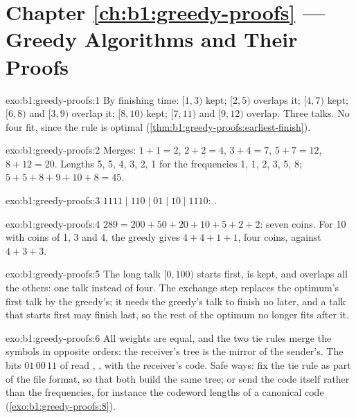 \section*{Chapter \ref{ch:b1:greedy-proofs} --- Greedy Algorithms and Their Proofs}

\begin{solution}{exo:b1:greedy-proofs:1}
By finishing time: $[1, 3)$ kept; $[2, 5)$ overlaps it; $[4, 7)$ kept; $[6, 8)$ and $[3, 9)$ overlap it; $[8, 10)$ kept;
$[7, 11)$ and $[9, 12)$ overlap. Three talks. No four fit, since the rule is optimal
(\cref{thm:b1:greedy-proofs:earliest-finish}).
\end{solution}

\begin{solution}{exo:b1:greedy-proofs:2}
Merges: $1 + 1 = 2$, $2 + 2 = 4$, $3 + 4 = 7$, $5 + 7 = 12$, $8 + 12 = 20$. Lengths 5, 5, 4, 3, 2, 1 for the frequencies
1, 1, 2, 3, 5, 8;  $5 + 5 + 8 + 9 + 10 + 8 = 45$.
\end{solution}

\begin{solution}{exo:b1:greedy-proofs:3}
$1111 \mid 110 \mid 01 \mid 10 \mid 1110$: .
\end{solution}

\begin{solution}{exo:b1:greedy-proofs:4}
$289 = 200 + 50 + 20 + 10 + 5 + 2 + 2$: seven coins. For 10 with coins of 1, 3 and 4, the greedy gives $4 + 4 + 1 + 1$,
four coins, against $4 + 3 + 3$.
\end{solution}

\begin{solution}{exo:b1:greedy-proofs:5}
The long talk $[0, 100)$ starts first, is kept, and overlaps all the others: one talk instead of four. The exchange step
replaces the optimum's first talk by the greedy's; it needs the greedy's talk to finish no later, and a talk that starts
first may finish last, so the rest of the optimum no longer fits after it.
\end{solution}

\begin{solution}{exo:b1:greedy-proofs:6}
All weights are equal, and the two tie rules merge the symbols in opposite orders: the receiver's tree is the mirror of
the sender's. The bits $01\,00\,11$ of  read , ,  with the receiver's code. Safe ways:
fix the tie rule as part of the file format, so that both build the same tree; or send the code itself rather than the
frequencies, for instance the codeword lengths of a canonical code (\cref{exo:b1:greedy-proofs:8}).
\end{solution}

